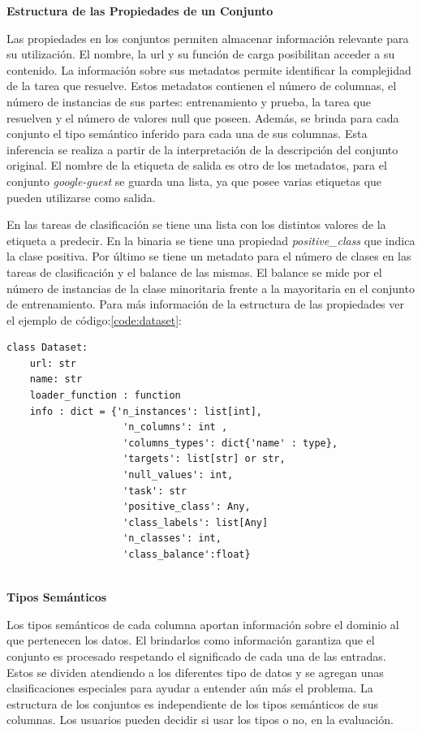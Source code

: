 \begin{flushleft} 
    { \textbf{Estructura de las Propiedades de un Conjunto}}\label{class:dataset_pro}
\end{flushleft}
Las propiedades en los conjuntos permiten almacenar información relevante para su utilización. El nombre, la url y su función de carga posibilitan acceder a su contenido.
La información sobre sus metadatos permite identificar la complejidad de la tarea que resuelve.
Estos metadatos contienen el número de columnas, el número de instancias de sus partes: entrenamiento y prueba, la tarea que resuelven y el número de 
valores null que poseen. Además, se brinda para cada conjunto el tipo semántico inferido para cada una de sus columnas. Esta inferencia se realiza a partir de la 
interpretación de la descripción del conjunto original. El nombre de la etiqueta de salida es otro de los metadatos, para el conjunto \textit{google-guest} 
se guarda una lista, ya que posee varias etiquetas que pueden utilizarse como salida. 

En las tareas de clasificación se tiene una lista con los distintos valores de la etiqueta a predecir. En la binaria se tiene una propiedad \textit{positive\_class} 
que indica la clase positiva. Por último se tiene un metadato para el número de clases en las tareas de clasificación y el balance de las mismas. 
El balance se mide por el número de instancias de la clase minoritaria frente a la mayoritaria en el conjunto de entrenamiento. 
Para más información de la estructura de las propiedades ver el ejemplo de código:\ref{code:dataset}:      

\begin{lstlisting}[caption= Clase Dataset, label = code:dataset]
class Dataset:
    url: str
    name: str
    loader_function : function
    info : dict = {'n_instances': list[int],
                    'n_columns': int , 
                    'columns_types': dict{'name' : type},
                    'targets': list[str] or str,
                    'null_values': int,
                    'task': str 
                    'positive_class': Any,
                    'class_labels': list[Any] 
                    'n_classes': int, 
                    'class_balance':float}
  
\end{lstlisting}

\begin{flushleft} 
    { \textbf{Tipos Semánticos}}\label{class:semantic_types}
\end{flushleft}
Los tipos semánticos de cada columna aportan información sobre el dominio al que pertenecen los datos. El brindarlos como información garantiza que el conjunto 
es procesado respetando el significado de cada una de las entradas. Estos se dividen atendiendo a los diferentes tipo de datos y 
se agregan unas clasificaciones especiales para ayudar a entender aún más el problema.
La estructura de los conjuntos es independiente de los tipos semánticos de sus columnas. Los usuarios pueden decidir si usar los tipos o no, en la evaluación. 

